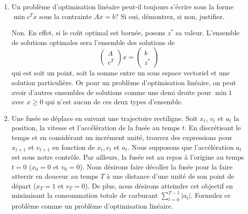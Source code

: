 \begin{enumerate}
  \item Un problème d'optimisation linéaire peut-il toujours s'écrire sous la forme $\min c^Tx$ sous la contrainte $Ax = b$? Si oui, démontrez, si non, justifiez.

    \begin{solution}
      Non. En effet,
      si le coût optimal est bornée, posons $z^*$ sa valeur.
      L'ensemble de solutions optimales sera l'ensemble des solutions de
      \[
        \begin{pmatrix}
          A\\c^T
        \end{pmatrix}
        x =
        \begin{pmatrix}
          b\\z^*
        \end{pmatrix}
      \]
      qui est soit un point, soit la somme entre un sous espace vectoriel
      et une solution particulière.
      Or pour un problème d'optimisation linéaire,
      on peut avoir d'autres ensembles de solutions comme une demi droite
      pour $\min 1$ avec $x \geq 0$
      qui n'est aucun de ces deux types d'ensemble.
    \end{solution}

  \item Une fusée se déplace en suivant une trajectoire rectiligne. Soit $x_t$, $v_t$
    et $a_t$ la position, la vitesse et l'accélération de la fusée au temps $t$. En discrétisant le temps et en considérant un incrément
    unité, trouvez des expressions pour $x_{t+1}$ et $v_{t+1}$ en fonction de $x_t, v_t$ et $a_t$. Nous supposons que l'accélération $a_t$ est sous notre
    contrôle. Par ailleurs, la fusée est au repos à l'origine au temps
    $t=0$ ($x_0=0$ et
    $v_0=0$). Nous désirons faire décoller la fusée pour la faire atterrir  en douceur au temps $T$ à une
    distance d'une unité de son point de départ ($x_T=1$ et $v_T=0$). De plus, nous désirons atteindre cet
    objectif en minimisant la consommation totale de carburant
    $\sum_{t=0}^{T-1} |a_t|$.  Formulez ce problème comme un problème d'optimisation linéaire.


\end{enumerate}
